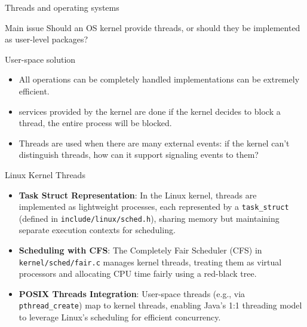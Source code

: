 \begin{slide}{Threads and operating systems}
  \begin{alertblock}{Main issue} 
    Should an OS kernel provide threads, or should they be implemented as user-level packages?
  \end{alertblock}
  \begin{block}{User-space solution}
    \begin{itemize}
    \item All operations can be completely handled  \mathexpr{\Rightarrow}
      implementations can be extremely efficient.
    \item {} services provided by the kernel are done  \mathexpr{\Rightarrow} if the kernel decides to block a thread, the entire process will be
      blocked.
    \item Threads are used when there are many external events: 
      \mathexpr{\Rightarrow} if the kernel can't distinguish threads, how can it support signaling events to
      them?
    \end{itemize}
  \end{block}
\end{slide}
\begin{slide}{Linux Kernel Threads}
\begin{itemize}
  \item \textbf{Task Struct Representation}: In the Linux kernel, threads are implemented as lightweight processes, each represented by a \texttt{task\_struct} (defined in \texttt{include/linux/sched.h}), sharing memory but maintaining separate execution contexts for scheduling.
  \item \textbf{Scheduling with CFS}: The Completely Fair Scheduler (CFS) in \texttt{kernel/sched/fair.c} manages kernel threads, treating them as virtual processors and allocating CPU time fairly using a red-black tree.
  \item \textbf{POSIX Threads Integration}: User-space threads (e.g., via \texttt{pthread\_create}) map to kernel threads, enabling Java’s 1:1 threading model to leverage Linux’s scheduling for efficient concurrency.
\end{itemize}
\end{slide}
